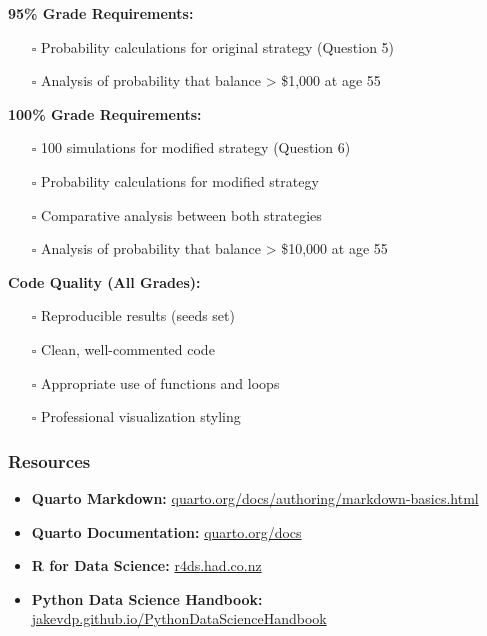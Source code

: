 \documentclass[
  letterpaper,
  DIV=11,
  numbers=noendperiod]{scrartcl}
\providecommand{\tightlist}{%
  \setlength{\itemsep}{0pt}\setlength{\parskip}{0pt}}
\theoremstyle{definition}
\theoremstyle{remark}
\begin{document}
\textbf{95\% Grade Requirements:}

\begin{itemize}
\tightlist
\item[$\square$]
  Probability calculations for original strategy (Question 5)
\item[$\square$]
  Analysis of probability that balance \textgreater{} \$1,000 at age 55
\end{itemize}

\textbf{100\% Grade Requirements:}

\begin{itemize}
\tightlist
\item[$\square$]
  100 simulations for modified strategy (Question 6)
\item[$\square$]
  Probability calculations for modified strategy
\item[$\square$]
  Comparative analysis between both strategies
\item[$\square$]
  Analysis of probability that balance \textgreater{} \$10,000 at age 55
\end{itemize}

\textbf{Code Quality (All Grades):}

\begin{itemize}
\tightlist
\item[$\square$]
  Reproducible results (seeds set)
\item[$\square$]
  Clean, well-commented code
\item[$\square$]
  Appropriate use of functions and loops
\item[$\square$]
  Professional visualization styling
\end{itemize}

\subsubsection{Resources}\label{resources}

\begin{itemize}
\tightlist
\item
  \textbf{Quarto Markdown:}
  \href{https://quarto.org/docs/authoring/markdown-basics.html}{quarto.org/docs/authoring/markdown-basics.html}
\item
  \textbf{Quarto Documentation:}
  \href{https://quarto.org/docs}{quarto.org/docs}
\item
  \textbf{R for Data Science:}
  \href{https://r4ds.had.co.nz}{r4ds.had.co.nz}
\item
  \textbf{Python Data Science Handbook:}
  \href{https://jakevdp.github.io/PythonDataScienceHandbook}{jakevdp.github.io/PythonDataScienceHandbook}
\end{itemize}
\end{document}
